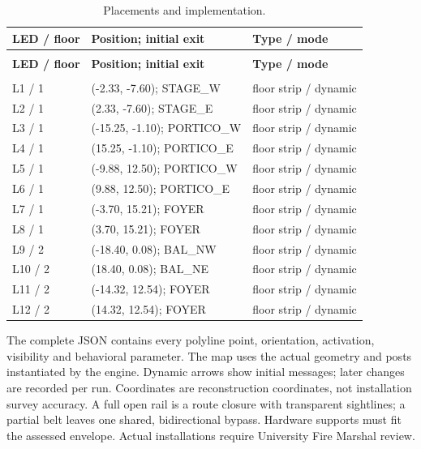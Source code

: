 \documentclass[11pt,a4paper]{article}
\begin{document}
\begingroup\small
\begin{longtable}{@{}>{\raggedright\arraybackslash}p{}>{\raggedright\arraybackslash}p{}>{\raggedright\arraybackslash}p{}@{}}
\caption{Placements and implementation.}\label{tab:7}\\
\toprule
\textbf{LED / floor} & \textbf{Position; initial exit} & \textbf{Type / mode} \\
\midrule\endfirsthead
\multicolumn{3}{l}{\small\itshape Table \thetable{} continued}\\\toprule
\textbf{LED / floor} & \textbf{Position; initial exit} & \textbf{Type / mode} \\
\midrule\endhead
\midrule\multicolumn{3}{r}{\small Continued on next page}\\\endfoot
\bottomrule\endlastfoot
L1 / 1 & (-2.33, -7.60); STAGE\_W & floor strip / dynamic \\
L2 / 1 & (2.33, -7.60); STAGE\_E & floor strip / dynamic \\
L3 / 1 & (-15.25, -1.10); PORTICO\_W & floor strip / dynamic \\
L4 / 1 & (15.25, -1.10); PORTICO\_E & floor strip / dynamic \\
L5 / 1 & (-9.88, 12.50); PORTICO\_W & floor strip / dynamic \\
L6 / 1 & (9.88, 12.50); PORTICO\_E & floor strip / dynamic \\
L7 / 1 & (-3.70, 15.21); FOYER & floor strip / dynamic \\
L8 / 1 & (3.70, 15.21); FOYER & floor strip / dynamic \\
L9 / 2 & (-18.40, 0.08); BAL\_NW & floor strip / dynamic \\
L10 / 2 & (18.40, 0.08); BAL\_NE & floor strip / dynamic \\
L11 / 2 & (-14.32, 12.54); FOYER & floor strip / dynamic \\
L12 / 2 & (14.32, 12.54); FOYER & floor strip / dynamic \\
\end{longtable}\endgroup

The complete JSON contains every polyline point, orientation, activation, visibility and behavioral parameter. The map uses the actual geometry and posts instantiated by the engine. Dynamic arrows show initial messages; later changes are recorded per run. Coordinates are reconstruction coordinates, not installation survey accuracy. A full open rail is a route closure with transparent sightlines; a partial belt leaves one shared, bidirectional bypass. Hardware supports must fit the assessed envelope. Actual installations require University Fire Marshal review.
\end{document}
